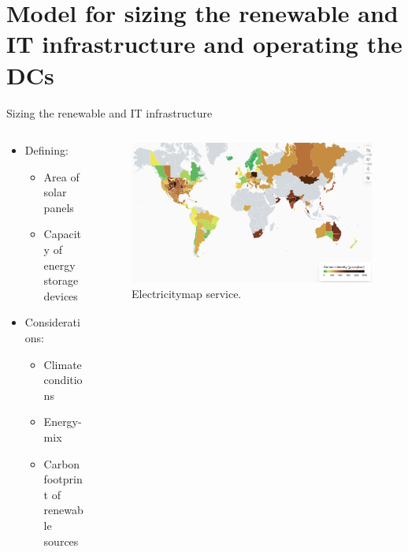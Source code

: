 \documentclass[Ligatures=TeX,table,svgnames,usetotalslideindicator,compress,10pt,aspectratio=169]{beamer}
\begin{document}
\section{Model for sizing the renewable and IT infrastructure and operating the DCs}



\begin{frame}{Sizing the renewable and IT infrastructure}  


  \begin{columns}        
\begin{column}{0.5\textwidth}
  \begin{itemize}
  \item Defining:  
  
  \begin{itemize}
  \item Area of solar panels
  \item Capacity of energy storage devices %
  \end{itemize}

\item{Considerations:}
\begin{itemize}
  \item Climate conditions
  \item Energy-mix
  \item Carbon footprint of renewable sources %
\end{itemize}
\end{itemize}
\end{column}        
\begin{column}{0.5\textwidth}
  \begin{center}
    \begin{figure}[!h]
      \centering
      \includegraphics[width=\textwidth]{images/electricity_map.png}
      \caption{Electricitymap service.}
    \end{figure}

  \end{center}

    \end{column}        
\end{columns}


\end{frame}
\end{document}
